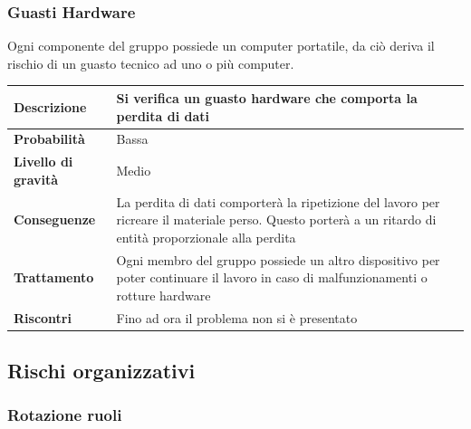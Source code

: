 \subsubsection{Guasti Hardware}
Ogni componente del gruppo possiede un computer portatile, da ciò deriva il rischio di un guasto tecnico ad uno o più computer.

\begin{center}
	
	\begin{tabular}{|>{\centering}m{4cm} ||>{\centering}m{8cm} |>{\centering\arraybackslash}m{0pt}@{}|}
		\hline
		\textbf{Descrizione} & Si verifica un guasto hardware che comporta la perdita di dati & \\[2ex]
		\hline	
		\textbf{Probabilità} & Bassa &\\[1ex]
		\hline
		\textbf{Livello di gravità} & Medio & \\[1ex]
		\hline
		\textbf{Conseguenze} & La perdita di dati comporterà la ripetizione del lavoro per ricreare il materiale perso. Questo porterà a un ritardo di entità proporzionale alla perdita & \\[1ex]
		\hline
		\textbf{Trattamento} & Ogni membro del gruppo possiede un altro dispositivo per poter continuare il lavoro in caso di malfunzionamenti o rotture hardware & \\[1ex] 
		\hline
		\textbf{Riscontri} & Fino ad ora il problema non si è presentato & \\[1ex]
		\hline
	\end{tabular}
	
\end{center}


\subsection{Rischi organizzativi}
\subsubsection{Rotazione ruoli}

